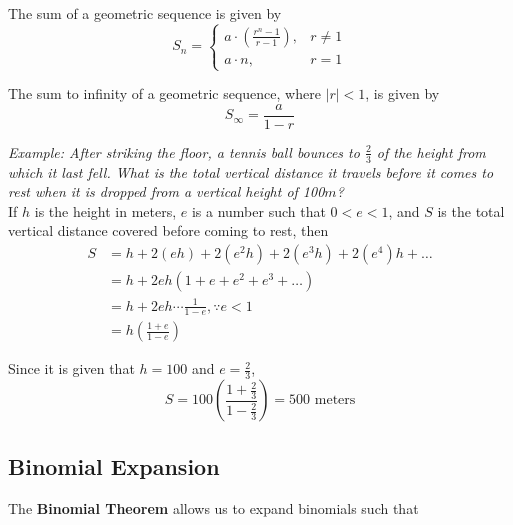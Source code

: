 \documentclass{article}
\begin{document}
    \noindent The sum of a geometric sequence is given by \\

    \begin{equation*}
        S_n = \begin{cases}
                  a\cdot (\frac{r^n-1}{r-1}), & r\not=1 \\
                  a\cdot n, & r=1
        \end{cases}
    \end{equation*}

    \noindent The sum to infinity of a geometric sequence, where $|r|<1$, is given by \\

    \begin{equation*}
        S_\infty=\frac{a}{1-r}
    \end{equation*}

    \noindent \color{blue} \textit{Example: After striking the floor, a tennis ball bounces
    to $\frac{2}{3}$ of the height from which it last fell. What is the total vertical
    distance it travels before it comes to rest when it is dropped from a vertical height of
    100$m$?} \color{black} \\

    \noindent If $h$ is the height in meters, $e$ is a number such that $0<e<1$, and $S$ is
    the total vertical distance covered before coming to rest, then \\

    \begin{align*}
        S &= h+2(eh)+2(e^2h)+2(e^3h)+2(e^4)h + \dots \\
        &= h+2eh(1+e+e^2+e^3+\dots) \\
        &= h+2eh \cdots \frac{1}{1-e}, \because e<1 \\
        &= h\left(\frac{1+e}{1-e}\right)
    \end{align*}

    \noindent Since it is given that $h=100$ and $e=\frac{2}{3}$, \\

    \begin{equation*}
        S=100\left(\frac{1+\frac{2}{3}}{1-\frac{2}{3}}\right)=500 \text{ meters}
    \end{equation*}

    \subsection{Binomial Expansion}
    The \textbf{Binomial Theorem} allows us to expand binomials such that \\
\end{document}

